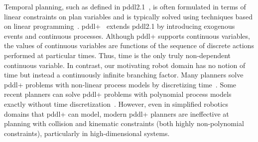 \documentclass[letterpaper]{article} %
\theoremstyle{plain}\newtheorem{thm}{Theorem}
\theoremstyle{definition}\newtheorem{defn}{Definition}
\theoremstyle{plain}\newtheorem{lem}{Lemma}
\theoremstyle{plain}\newtheorem{cor}{Corollary}
\begin{document}

Temporal planning, such as defined in {\sc pddl2.1}~\cite{Fox03pddl2.1:an}, is often formulated in terms of linear constraints on plan variables and is typically solved using techniques based on linear programming~\cite{hoffmann2003metric,coles2013hybrid}. 
{\sc pddl+}~\cite{fox2006modelling} extends {\sc pddl2.1} by introducing exogenous events and continuous processes. 
Although {\sc pddl+} supports continuous variables, the values of continuous variables are functions of the sequence of discrete actions performed at particular times. 
Thus, time is the only truly non-dependent continuous variable. 
In contrast, our motivating robot domain has no notion of time but instead a continuously infinite branching factor.
Many planners solve {\sc pddl+} problems with non-linear process models by discretizing time~\cite{della2009upmurphi,piotrowski2016heuristic}. Some recent planners can solve {\sc pddl+} problems with polynomial process models exactly without time discretization~\cite{bryce2015smt,cashmore2016compilation}.
However, even in simplified robotics domains that {\sc pddl+} can model, modern {\sc pddl+} planners are ineffective at planning with collision and kinematic constraints (both highly non-polynomial constraints), particularly in high-dimensional systems.

\end{document}
